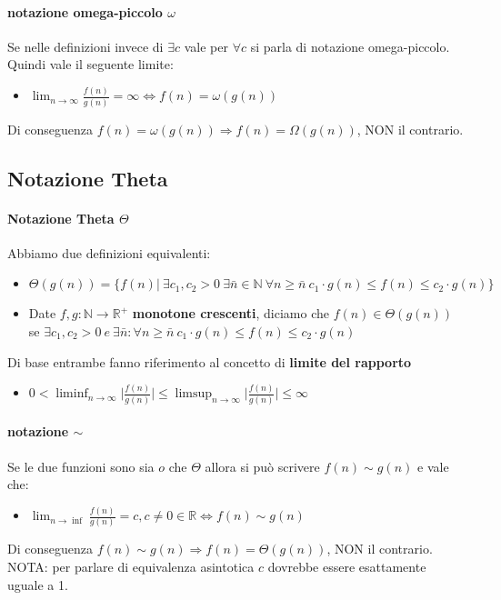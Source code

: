 \documentclass{article}
\begin{document}
\paragraph{notazione omega-piccolo $\omega$} Se nelle definizioni invece di $\exists c$ vale per $\forall c$  si parla di notazione omega-piccolo. Quindi vale il seguente limite:
\begin{itemize}
    \item $\displaystyle \lim_{n\to\infty} \frac{f(n)}{g(n)} = \infty \Leftrightarrow f(n) = \omega(g(n))$
\end{itemize}
Di conseguenza $f(n) = \omega(g(n)) \Rightarrow f(n) = \Omega(g(n))$, NON il contrario.

\subsection{Notazione Theta} %
\paragraph{Notazione Theta $\Theta$} Abbiamo due definizioni equivalenti:
\begin{itemize}
\item $\Theta(g(n))=\{f(n)| \ \exists c_1, c_2 > 0 \ \exists \bar{n} \in \mathbb{N} \ \forall n \geq \bar{n} \ c_1 \cdot g(n) \leq f(n) \leq c_2 \cdot g(n)\}$
\item Date $f,g : \mathbb{N} \rightarrow \mathbb{R^+}$ \textbf{monotone crescenti}, diciamo che $f(n) \in \Theta(g(n))$ se $\exists c_1, c_2 > 0 \ e \ \exists \bar{n} : \forall n \geq \bar{n} \ c_1 \cdot g(n) \leq f(n) \leq c_2 \cdot g(n)$
\end{itemize}

Di base entrambe fanno riferimento al concetto di \textbf{limite del rapporto}
\begin{itemize}
    \item $\displaystyle 0 < \liminf_{n\to\infty} \lvert \frac{f(n)}{g(n)}\rvert \leq \limsup_{n\to\infty}\lvert \frac{f(n)}{g(n)}\rvert \leq \infty$
\end{itemize}

\paragraph{notazione $\sim$}  Se le due funzioni sono sia $o$ che $\Theta$ allora si può scrivere $f(n) \sim g(n)$ e vale che:
\begin{itemize}
    \item $\displaystyle \lim_{n \rightarrow \inf} \frac{f(n)}{g(n)} = c , c \neq 0 \in \mathbb{R} \Leftrightarrow f(n) \sim g(n)$
\end{itemize}
Di conseguenza $f(n) \sim g(n) \Rightarrow f(n) = \Theta(g(n))$, NON il contrario. \newline
NOTA: per parlare di equivalenza asintotica $c$ dovrebbe essere esattamente uguale a 1.
\newpage
\end{document}

